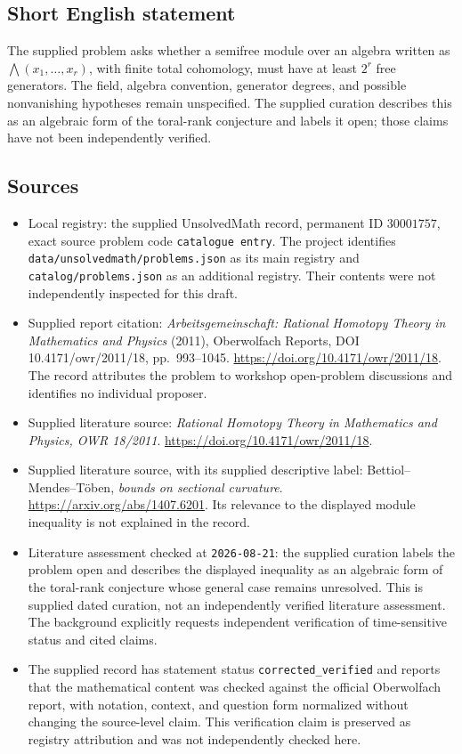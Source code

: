 \documentclass[11pt]{article}
\begin{document}
\subsection{Short English statement}
The supplied problem asks whether a semifree module over an algebra written as \(\bigwedge(x_1,\ldots,x_r)\), with finite total cohomology, must have at least \(2^r\) free generators. The field, algebra convention, generator degrees, and possible nonvanishing hypotheses remain unspecified. The supplied curation describes this as an algebraic form of the toral-rank conjecture and labels it open; those claims have not been independently verified.
\subsection{Sources}
\begin{itemize}
\item Local registry: the supplied UnsolvedMath record, permanent ID \(30001757\), exact source problem code \texttt{catalogue entry}. The project identifies \texttt{data/unsolvedmath/problems.json} as its main registry and \texttt{catalog/problems.json} as an additional registry. Their contents were not independently inspected for this draft.
\item Supplied report citation: \emph{Arbeitsgemeinschaft: Rational Homotopy Theory in Mathematics and Physics} (2011), Oberwolfach Reports, DOI 10.4171/owr/2011/18, pp.\ 993--1045. \url{https://doi.org/10.4171/owr/2011/18}. The record attributes the problem to workshop open-problem discussions and identifies no individual proposer.
\item Supplied literature source: \emph{Rational Homotopy Theory in Mathematics and Physics, OWR 18/2011}. \url{https://doi.org/10.4171/owr/2011/18}.
\item Supplied literature source, with its supplied descriptive label: Bettiol--Mendes--T\"oben, \emph{bounds on sectional curvature}. \url{https://arxiv.org/abs/1407.6201}. Its relevance to the displayed module inequality is not explained in the record.
\item Literature assessment checked at \texttt{2026-08-21}: the supplied curation labels the problem open and describes the displayed inequality as an algebraic form of the toral-rank conjecture whose general case remains unresolved. This is supplied dated curation, not an independently verified literature assessment. The background explicitly requests independent verification of time-sensitive status and cited claims.
\item The supplied record has statement status \texttt{corrected\_verified} and reports that the mathematical content was checked against the official Oberwolfach report, with notation, context, and question form normalized without changing the source-level claim. This verification claim is preserved as registry attribution and was not independently checked here.
\end{itemize}
\end{document}
